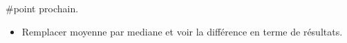 #point prochain.

\begin{itemize}
	\item Remplacer moyenne par mediane et voir la différence en terme de résultats. 
\end{itemize}